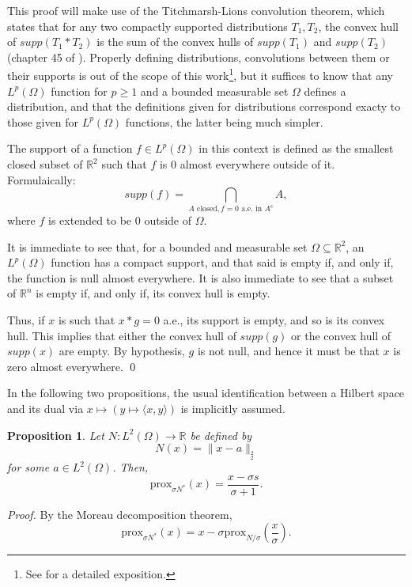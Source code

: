 \documentclass[twocolumn,twoside,a4paper,10pt]{IEEEtran}
\newtheorem{proposition}{Proposition}
\begin{document}
This proof will make use of the Titchmarsh-Lions convolution theorem, which states that for any two compactly supported distributions \(T_1, T_2\), the convex hull of \(supp(T_1\ast T_2)\) is the sum of the convex hulls of \(supp(T_1)\) and \(supp(T_2)\) (chapter 45 of \cite{donoghue1969distributions}). Properly defining distributions, convolutions between them or their supports is out of the scope of this work\footnote{See \cite{donoghue1969distributions} for a detailed exposition.}, but it suffices to know that any \(L^p(\Omega)\) function for \(p\geq 1\) and a bounded measurable set \(\Omega\) defines a distribution, and that the definitions given for distributions correspond exacty to those given for \(L^p(\Omega)\) functions, the latter being much simpler.

The support of a function \(f\in L^p(\Omega)\) in this context is defined as the smallest closed subset of \(\mathbb{R}^2\) such that \(f\) is \(0\) almost everywhere outside of it. Formulaically:
\[
  supp(f) = \bigcap_{A \text{ closed}, f=0 \text{ a.e. in } A^c}A
,\]
where \(f\) is extended to be \(0\) outside of \(\Omega\).

It is immediate to see that, for a bounded and measurable set \(\Omega\subseteq \mathbb{R}^2\), an \(L^p(\Omega)\) function has a compact support, and that said is empty if, and only if, the function is null almost everywhere. It is also immediate to see that a subset of \(\mathbb{R}^n\) is empty if, and only if, its convex hull is empty.

Thus, if \(x\) is such that \(x\ast g=0\) a.e., its support is empty, and so is its convex hull. This implies that either the convex hull of \(supp(g)\) or the convex hull of \(supp(x)\) are empty. By hypothesis, \(g\) is not null, and hence it must be that \(x\) is zero almost everywhere. \qed

In the following two propositions, the usual identification between a Hilbert space and its dual via \(x\mapsto(y\mapsto\langle x,y\rangle)\) is implicitly assumed.

\begin{proposition}\label{prop:proximity-square-norm}
  Let \(N\colon L^2(\Omega)\to \mathbb{R}\) be defined by
  \[
    N(x) = \|x-a\|_{_2^2}
  \]
  for some \(a\in L^2(\Omega)\). Then,
  \[
  \text{prox}_{\sigma N^*}(x) = \frac{x - \sigma s}{\sigma + 1}
  .\]

\end{proposition}
\textit{Proof.}
By the Moreau decomposition theorem,
\begin{equation}\label{eq:proximity-moreau}
  \text{prox}_{\sigma N^*}(x) = x - \sigma\text{prox}_{N/\sigma}\left(\frac x\sigma\right).
\end{equation}
\end{document}
